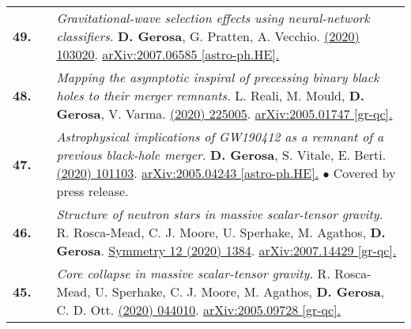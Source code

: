 {\begin{longtable}{rp{0.3cm}p{15.8cm}}
%
\textbf{49.} & & \textit{Gravitational-wave selection effects using neural-network classifiers.}
\newline{}
\textbf{D. Gerosa}, G. Pratten, A. Vecchio.
\newline{}
\href{https://journals.aps.org/prd/abstract/10.1103/PhysRevD.102.103020}{\prd 102 (2020) 103020}. \href{https://arxiv.org/abs/2007.06585}{arXiv:2007.06585 [astro-ph.HE].}
\vspace{0.09cm}\\
%
\textbf{48.} & & \textit{Mapping the asymptotic inspiral of precessing binary black holes to their merger remnants.}
\newline{}
L. Reali, M. Mould, \textbf{D. Gerosa}, V. Varma.
\newline{}
\href{https://iopscience.iop.org/article/10.1088/1361-6382/abb639/meta}{\cqg 37 (2020) 225005}. \href{https://arxiv.org/abs/2005.01747}{arXiv:2005.01747 [gr-qc].}
\vspace{0.09cm}\\
%
\textbf{47.} & & \textit{Astrophysical implications of GW190412 as a remnant of a previous black-hole merger.}
\newline{}
\textbf{D. Gerosa}, S. Vitale, E. Berti.
\newline{}
\href{https://journals.aps.org/prl/abstract/10.1103/PhysRevLett.125.101103}{\prl 125 (2020) 101103}. \href{https://arxiv.org/abs/2005.04243}{arXiv:2005.04243 [astro-ph.HE].}
\newline{}
\textcolor{color1}{$\bullet$} Covered by press release.
\vspace{0.09cm}\\
%
\textbf{46.} & & \textit{Structure of neutron stars in massive scalar-tensor gravity.}
\newline{}
R. Rosca-Mead, C. J. Moore, U. Sperhake, M. Agathos, \textbf{D. Gerosa}.
\newline{}
\href{https://www.mdpi.com/2073-8994/12/9/1384}{Symmetry 12 (2020) 1384}. \href{https://arxiv.org/abs/2007.14429}{arXiv:2007.14429 [gr-qc].}
\vspace{0.09cm}\\
%
\textbf{45.} & & \textit{Core collapse in massive scalar-tensor gravity.}
\newline{}
R. Rosca-Mead, U. Sperhake, C. J. Moore, M. Agathos, \textbf{D. Gerosa}, C. D. Ott.
\newline{}
\href{https://journals.aps.org/prd/abstract/10.1103/PhysRevD.102.044010}{\prd 102 (2020) 044010}. \href{https://arxiv.org/abs/2005.09728}{arXiv:2005.09728 [gr-qc].}

\end{longtable}}
